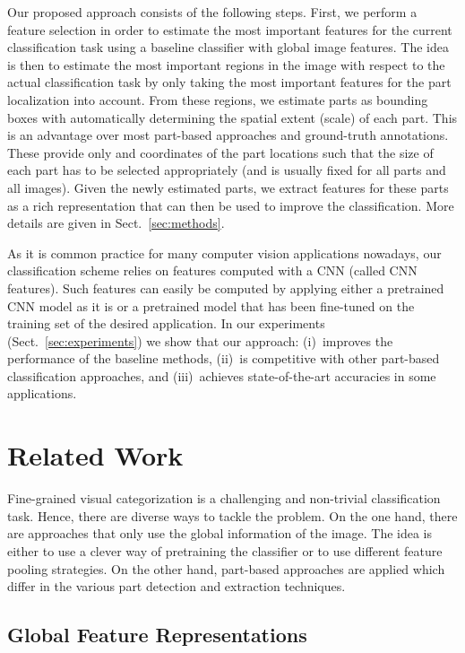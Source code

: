 \documentclass[runningheads]{llncs}
\begin{document}
Our proposed approach consists of the following steps.
First, we perform a feature selection in order to estimate the most important features for the current classification task using a baseline classifier with global image features.
The idea is then to estimate the most important regions in the image with respect to the actual classification task by only taking the most important features for the part localization into account.
From these regions, we estimate parts as bounding boxes with automatically determining the spatial extent (scale) of each part.
This is an advantage over most part-based approaches and ground-truth annotations.
These provide only  and  coordinates of the part locations such that the size of each part has to be selected appropriately (and is usually fixed for all parts and all images).
Given the newly estimated parts, we extract features for these parts as a rich representation that can then be used to improve the classification.
More details are given in Sect.~\ref{sec:methods}.

As it is common practice for many computer vision applications nowadays, our classification scheme relies on features computed with a CNN (called CNN features).
Such features can easily be computed by applying either a pretrained CNN model as it is or a pretrained model that has been fine-tuned on the training set of the desired application.
In our experiments (Sect.~\ref{sec:experiments}) we show that our approach: (i)~improves the performance of the baseline methods, (ii)~is competitive with other part-based classification approaches, and (iii)~achieves state-of-the-art accuracies in some applications.





 	\section{Related Work}
\label{sec:related_work}

Fine-grained visual categorization is a challenging and non-trivial classification task.
Hence, there are diverse ways to tackle the problem.
On the one hand, there are approaches that only use the global information of the image.
The idea is either to use a clever way of pretraining the classifier or to use different feature pooling strategies.
On the other hand, part-based approaches are applied which differ in the various part detection and extraction techniques.

\subsection{Global Feature Representations}
\label{sub:fine_grained_visual_categorization}
\end{document}
